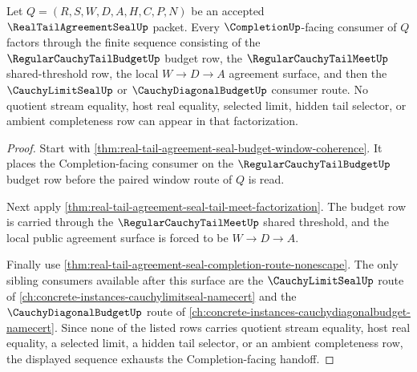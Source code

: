 \begin{theorem}
\label{thm:real-tail-agreement-seal-completion-budget-threshold-exhaustion}
Let $Q=(R,S,W,D,A,H,C,P,N)$ be an accepted $\RealTailAgreementSealUp$ packet. Every $\CompletionUp$-facing consumer of $Q$ factors through the finite sequence consisting of the $\RegularCauchyTailBudgetUp$ budget row, the $\RegularCauchyTailMeetUp$ shared-threshold row, the local $W \to D \to A$ agreement surface, and then the $\CauchyLimitSealUp$ or $\CauchyDiagonalBudgetUp$ consumer route. No quotient stream equality, host real equality, selected limit, hidden tail selector, or ambient completeness row can appear in that factorization.
\end{theorem}
\begin{proof}
Start with \autoref{thm:real-tail-agreement-seal-budget-window-coherence}. It places the Completion-facing consumer on the $\RegularCauchyTailBudgetUp$ budget row before the paired window route of $Q$ is read.

Next apply \autoref{thm:real-tail-agreement-seal-tail-meet-factorization}. The budget row is carried through the $\RegularCauchyTailMeetUp$ shared threshold, and the local public agreement surface is forced to be $W \to D \to A$.

Finally use \autoref{thm:real-tail-agreement-seal-completion-route-nonescape}. The only sibling consumers available after this surface are the $\CauchyLimitSealUp$ route of \autoref{ch:concrete-instances-cauchylimitseal-namecert} and the $\CauchyDiagonalBudgetUp$ route of \autoref{ch:concrete-instances-cauchydiagonalbudget-namecert}. Since none of the listed rows carries quotient stream equality, host real equality, a selected limit, a hidden tail selector, or an ambient completeness row, the displayed sequence exhausts the Completion-facing handoff.
\end{proof}

